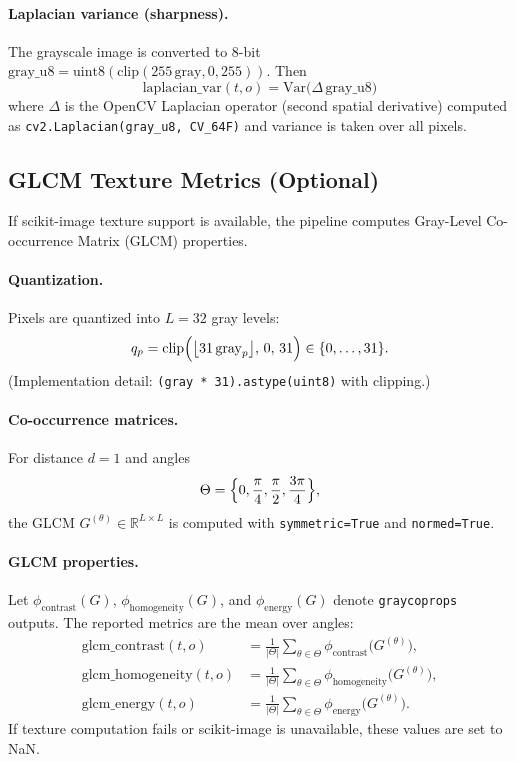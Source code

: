 \documentclass{article}
\begin{document}
\paragraph{Laplacian variance (sharpness).}
The grayscale image is converted to 8-bit
$\mathrm{gray\_u8} = \mathrm{uint8}(\mathrm{clip}(255\,\mathrm{gray},0,255))$.
Then
\begin{equation}
\mathrm{laplacian\_var}(t,o) = \mathrm{Var}\bigl(\Delta\,\mathrm{gray\_u8}\bigr)
\end{equation}
where $\Delta$ is the OpenCV Laplacian operator (second spatial derivative) computed as
\texttt{cv2.Laplacian(gray\_u8, CV\_64F)} and variance is taken over all pixels.

\subsection{GLCM Texture Metrics (Optional)}

If scikit-image texture support is available, the pipeline computes Gray-Level Co-occurrence Matrix (GLCM) properties.

\paragraph{Quantization.}
Pixels are quantized into $L=32$ gray levels:
\begin{equation}
q_p = \mathrm{clip}\Bigl(\bigl\lfloor 31\,\mathrm{gray}_p\bigr\rfloor,\,0,\,31\Bigr)\in\{0,\dots,31\}.
\end{equation}
(Implementation detail: \texttt{(gray * 31).astype(uint8)} with clipping.)

\paragraph{Co-occurrence matrices.}
For distance $d=1$ and angles
\begin{equation}
\Theta = \Bigl\{0,\frac{\pi}{4},\frac{\pi}{2},\frac{3\pi}{4}\Bigr\},
\end{equation}
the GLCM $G^{(\theta)}\in\mathbb{R}^{L\times L}$ is computed with
\texttt{symmetric=True} and \texttt{normed=True}.

\paragraph{GLCM properties.}
Let $\phi_{\mathrm{contrast}}(G)$, $\phi_{\mathrm{homogeneity}}(G)$, and $\phi_{\mathrm{energy}}(G)$
denote \texttt{graycoprops} outputs. The reported metrics are the mean over angles:
\begin{align}
\mathrm{glcm\_contrast}(t,o) &= \frac{1}{|\Theta|}\sum_{\theta\in\Theta} \phi_{\mathrm{contrast}}\bigl(G^{(\theta)}\bigr),\\
\mathrm{glcm\_homogeneity}(t,o) &= \frac{1}{|\Theta|}\sum_{\theta\in\Theta} \phi_{\mathrm{homogeneity}}\bigl(G^{(\theta)}\bigr),\\
\mathrm{glcm\_energy}(t,o) &= \frac{1}{|\Theta|}\sum_{\theta\in\Theta} \phi_{\mathrm{energy}}\bigl(G^{(\theta)}\bigr).
\end{align}
If texture computation fails or scikit-image is unavailable, these values are set to NaN.
\end{document}

